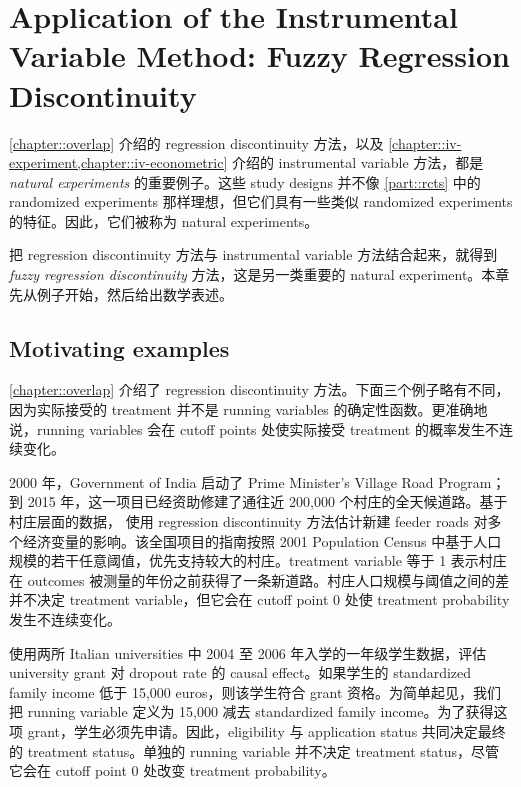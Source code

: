  
\chapter{Application of the Instrumental Variable Method: Fuzzy Regression Discontinuity}
 \label{chapter::iv-frdd}



\cref{chapter::overlap} 介绍的 regression discontinuity 方法，以及 \cref{chapter::iv-experiment,chapter::iv-econometric} 介绍的 instrumental variable 方法，都是 {\it natural experiments} 的重要例子。这些 study designs 并不像 \cref{part::rcts} 中的 randomized experiments 那样理想，但它们具有一些类似 randomized experiments 的特征。因此，它们被称为 natural experiments。


把 regression discontinuity 方法与 instrumental variable 方法结合起来，就得到 {\it fuzzy regression discontinuity} 方法，这是另一类重要的 natural experiment。本章先从例子开始，然后给出数学表述。




\section{Motivating examples}
\label{sec::frdd-motivation}

\cref{chapter::overlap} 介绍了 regression discontinuity 方法。下面三个例子略有不同，因为实际接受的 treatment 并不是 running variables 的确定性函数。更准确地说，running variables 会在 cutoff points 处使实际接受 treatment 的概率发生不连续变化。

\begin{example}\label{eg::indianroad}
2000 年，Government of India 启动了 Prime Minister's Village Road Program；到 2015 年，这一项目已经资助修建了通往近 200,000 个村庄的全天候道路。基于村庄层面的数据，
\citet{asher2020rural} 使用 regression discontinuity 方法估计新建 feeder roads 对多个经济变量的影响。该全国项目的指南按照 2001 Population Census 中基于人口规模的若干任意阈值，优先支持较大的村庄。treatment variable 等于 1 表示村庄在 outcomes 被测量的年份之前获得了一条新道路。村庄人口规模与阈值之间的差并不决定 treatment variable，但它会在 cutoff point 0 处使 treatment probability 发生不连续变化。
\end{example}


\begin{example}\label{eg::italianuniversity}
\citet{li2015evaluating} 使用两所 Italian universities 中 2004 至 2006 年入学的一年级学生数据，评估 university grant 对 dropout rate 的 causal effect。如果学生的 standardized family income 低于 15,000 euros，则该学生符合 grant 资格。为简单起见，我们把 running variable 定义为 15,000 减去 standardized family income。为了获得这项 grant，学生必须先申请。因此，eligibility 与 application status 共同决定最终的 treatment status。单独的 running variable 并不决定 treatment status，尽管它会在 cutoff point 0 处改变 treatment probability。
\end{example}



